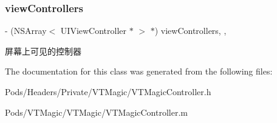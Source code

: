 \subsubsection{\texorpdfstring{view\+Controllers}{viewControllers}}
{\footnotesize\ttfamily -\/ (N\+S\+Array$<$ U\+I\+View\+Controller $\ast$ $>$ $\ast$) view\+Controllers\hspace{0.3cm}{\ttfamily [read]}, {\ttfamily [nonatomic]}, {\ttfamily [strong]}}

屏幕上可见的控制器 

The documentation for this class was generated from the following files\+:\begin{DoxyCompactItemize}
\item 
Pods/\+Headers/\+Private/\+V\+T\+Magic/V\+T\+Magic\+Controller.\+h\item 
Pods/\+V\+T\+Magic/\+V\+T\+Magic/V\+T\+Magic\+Controller.\+m\end{DoxyCompactItemize}
